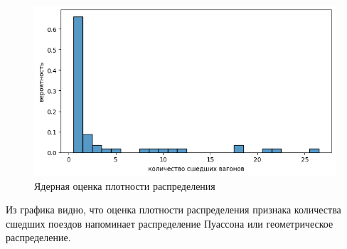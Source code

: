 \begin{figure}[H]
    \begin{center}
        \includegraphics[width=1.0\linewidth]{src/img/KDE.png}
        \caption{Ядерная оценка плотности распределения}
        \label{fig:kde}
    \end{center}
\end{figure}

Из графика видно, что оценка плотности распределения признака количества сшедших поездов напоминает распределение Пуассона или геометрическое распределение.


